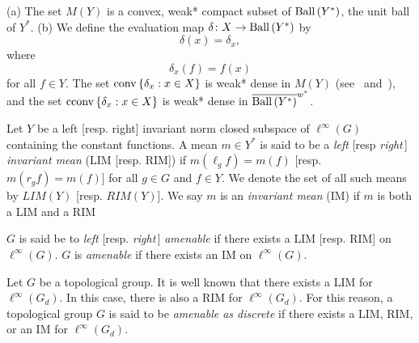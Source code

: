 \begin{remark}\label{dense}
(a) The set $M(Y)$ is a convex, weak* compact subset of $\operatorname{Ball\,}(Y^*)$, the unit ball of $Y^*$.
(b) We define the evaluation map $\delta\colon X \rightarrow \operatorname{Ball\,}(Y^*)$ by
\[
\delta(x) = \delta_x,
\]
where
\[
\delta_x (f) = f(x)
\]
for all $f\in Y$.  The set $\operatorname{conv\,} \{\delta_x: x\in X\}$ is weak* dense in $M(Y)$
(see~\cite[p. 281]{day:1950} and~\cite[p. 513]{day:first}), and the set
$\operatorname{cconv\,}\{\delta_x: x\in X\}$ is weak* dense in $\overline{\operatorname{Ball\,}(Y^*)}^{w^*}$.
\end{remark}

Let $Y$ be a left [resp. right] invariant norm closed subspace of $\ell^\infty(G)$ containing the constant
functions.  A mean $m\in Y^*$ is said to be a {\it left} [resp {\it right}\,] {\it invariant mean}
(LIM [resp. RIM]) if $m(\ell_g f) = m(f)$ [resp. $m(r_g f) = m(f)$] for all $g\in G$
and $f\in Y$. We denote the set of all such means by $LIM(Y)$ [resp. $RIM(Y)$].
We say $m$ is an {\it invariant mean} (IM) if $m$ is both a LIM and a RIM

$G$ is said be to {\it left} [resp. {\it right}\,] {\it amenable} if there exists a LIM [resp. RIM] on $\ell^\infty(G)$.
$G$ is {\it amenable} if there exists an IM on $\ell^\infty(G)$.

Let $G$ be a topological group.
It is well known that there exists a LIM for $\ell^\infty(G_d)$. In this case, there is also
a RIM for $\ell^\infty(G_d)$.  For this reason, a topological group $G$ is said to be
{\it amenable as discrete} if there exists a LIM, RIM, or an IM for $\ell^\infty(G_d)$.




